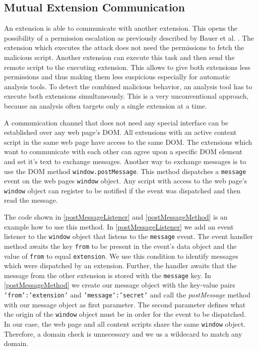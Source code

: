 	
\subsection{Mutual Extension Communication}
\label{sec:mutualExtensionCommunication}

	An extension is able to communicate with another extension. This opens the possibility of a permission escalation as previously described by Bauer et al. \cite{extensions:cns14}. The extension which executes the attack does not need the permissions to fetch the malicious script. Another extension can execute this task and then send the remote script to the executing extension. This allows to give both extensions less permissions and thus making them less suspicious especially for automatic analysis tools. To detect the combined malicious behavior, an analysis tool has to execute both extensions simultaneously. This is a very unconventional approach, because an analysis often targets only a single extension at a time. 
	
	A communication channel that does not need any special interface can be established over any web page's DOM. All extensions with an active content script in the same web page have access to the same DOM. The extensions which want to communicate with each other can agree upon a specific DOM element and set it's text to exchange messages. Another way to exchange messages is to use the DOM method \texttt{window.postMessage}. This method dispatches a \texttt{message} event on the web pages \texttt{window} object. Any script with access to the web page's \texttt{window} object can register to be notified if the event was dispatched and then read the message. 
	
	The code shown in \autoref{postMessageListener} and \autoref{postMessageMethod} is an example how to use this method. In \autoref{postMessageListener} we add an event listener to the \texttt{window} object that listens to the \texttt{message} event. The event handler method awaits the key \texttt{from} to be present in the event's data object and the value of \texttt{from} to equal \texttt{extension}. We use this condition to identify messages which were dispatched by an extension. Further, the handler awaits that the message from the other extension is stored with the \texttt{message} key. In \autoref{postMessageMethod} we create our message object with the key-value pairs \texttt{'from':'extension'} and \texttt{'message':'secret'} and call the \textit{postMessage} method with our message object as first parameter. The second parameter defines what the origin of the \texttt{window} object must be in order for the event to be dispatched. In our case, the web page and all content scripts share the same \texttt{window} object. Therefore, a domain check is unnecessary and we us a wildecard to match any domain.
	
